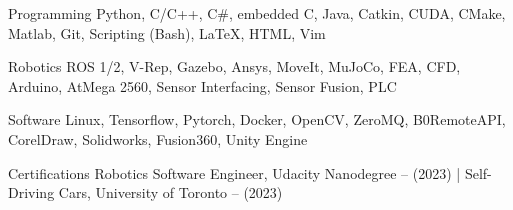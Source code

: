 
\begin{cvskills}

  \cvskill
    { Programming} %
    { Python, C/C++, C\#, embedded C, Java, Catkin, CUDA, CMake, Matlab, Git, Scripting (Bash), LaTeX, HTML, Vim}

  \cvskill
    { Robotics} %
    { ROS 1/2, V-Rep, Gazebo, Ansys, MoveIt, MuJoCo, FEA, CFD, Arduino, AtMega 2560, Sensor Interfacing, Sensor Fusion, PLC }

  \cvskill
    { Software} %
    { Linux, Tensorflow, Pytorch, Docker, OpenCV, ZeroMQ, B0RemoteAPI, CorelDraw, Solidworks, Fusion360, Unity Engine}

  \cvskill
    { Certifications} %
    { Robotics Software Engineer, Udacity Nanodegree -- (2023) | Self-Driving Cars, University of Toronto -- (2023)}


\end{cvskills}
